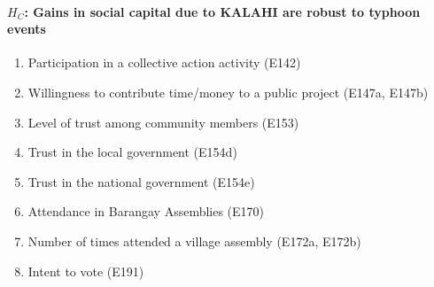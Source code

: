 \documentclass[12pt]{article}
\begin{document}
	\paragraph{$H_C$: Gains in social capital due to KALAHI are robust to typhoon events}
	
	    \begin{enumerate}
		\item Participation in a collective action activity (E142)
		\item Willingness to contribute time/money to a public project (E147a, E147b)
		\item Level of trust among community members (E153)
		\item Trust in the local government (E154d)
		\item Trust in the national government (E154e)
		\item Attendance in Barangay Assemblies (E170)
		\item Number of times attended a village assembly (E172a, E172b)
		\item Intent to vote (E191)
		\end{enumerate}






\end{document}
